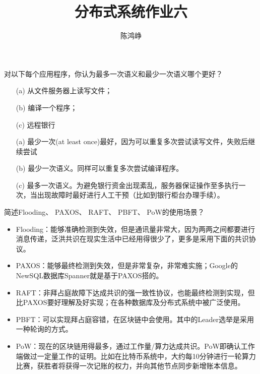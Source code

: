 \documentclass[logo,reportComp]{thesis}
\title{分布式系统作业六}
\subtitle{}
\author{陈鸿峥}
\begin{document}
\maketitle

\begin{question}
对以下每个应用程序，你认为最多一次语义和最少一次语义哪个更好？
\begin{itemize}
\item [(a)] 从文件服务器上读写文件；
\item [(b)] 编译一个程序；
\item [(c)] 远程银行
\end{itemize}
\end{question}
\begin{answer}
\begin{itemize}
	\item [(a)] 最少一次(at least once)最好，因为可以重复多次尝试读写文件，失败后继续尝试
	\item [(b)] 最少一次语义。同样可以重复多次尝试编译程序。
	\item [(c)] 最多一次语义。为避免银行资金出现紊乱，服务器保证操作至多执行一次，当出现故障时最好进行人工干预（比如到银行柜台办理手续）。
\end{itemize}
\end{answer}

\begin{question}
简述Flooding、 PAXOS、 RAFT、 PBFT、 PoW的使用场景？
\end{question}
\begin{answer}
\begin{itemize}
	\item Flooding：能够准确检测到失效，但是通讯量非常大，因为两两之间都要进行消息传递，泛洪共识在现实生活中已经用得很少了，更多是采用下面的共识协议\cite{bib:flooding}。
	\item PAXOS：能够最终检测到失效，但是非常复杂，非常难实施；Google的NewSQL数据库Spanner\cite{bib:spanner}就是基于PAXOS搭的。
	\item RAFT：非拜占庭故障下达成共识的强一致性协议，也能最终检测到实现，但比PAXOS要好理解及好实现；在各种数据库及分布式系统中被广泛使用\cite{bib:raft}。
	\item PBFT：可以实现拜占庭容错，在区块链中会使用。其中的Leader选举是采用一种轮询的方式\cite{bib:pbft}。
	\item PoW：现在的区块链用得最多，通过工作量/算力达成共识。PoW即确认工作端做过一定量工作的证明。比如在比特币系统\cite{bib:bitcoin}中，大约每10分钟进行一轮算力比赛，获胜者将获得一次记账的权力，并向其他节点同步新增账本信息。
\end{itemize}
\end{answer}
\end{document}
